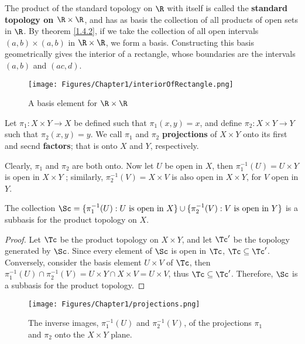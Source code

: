 \begin{example}
    The product of the standard topology on $\R$ with itself is called the \textbf{standard topology 
    on $\R \times \R$}, and has as basis the collection of all products of open sets in $\R$. 
    By theorem \ref{1.4.2}, if we take the collection of all open intervals $(a,b) \times (a,b)$ in 
    $\R \times \R$, we form a basis. Constructing this basis geometrically gives the interior of 
    a rectangle, whose boundaries are the intervals  $(a,b)$ and  $(ac,d)$.

    \begin{figure}
        \centering
        \texttt{[image: Figures/Chapter1/interiorOfRectangle.png]}
        \caption{A basis element for $\R \times \R$}
        \label{fig1.4}
    \end{figure}
\end{example} 

\begin{definition}
    Let $\pi_1:X \times Y \rightarrow X$ be defined such that  $\pi_1(x,y)=x$, and define $\pi_2:X \times Y \rightarrow Y$ 
    such that $\pi_2(x,y)=y$. We call $\pi_1$ and $\pi_2$ \textbf{projections} of $X \times Y$ onto 
    its  first and secnd \textbf{factors}; that is onto $X$ and $Y$, respectively.
\end{definition}

Clearly, $\pi_1$ and $\pi_2$ are both onto. Now let $U$ be open in  $X$, then 
$\pi_1^{-1}(U)=U \times Y$ is open in $X \times Y$ ; similarly, $\pi_2^{-1}(V)=X \times V$ is also open 
in $X \times Y$, for  $V$ open in  $Y$.

\begin{theorem}\label{1.4.3}
    The collection $\Sc=\{\pi_1^{-1}(U): U \text{ is open in } X\} \cup \{\pi_2^{-1}(V): V \text{ is open in } Y\}$ 
    is a subbasis for the product topology on $X$.
\end{theorem}
\begin{proof}
    Let $\Tc$ be the product topology on  $X \times Y$, and let  $\Tc'$ be the topology 
    generated by $\Sc$. Since every element of  $\Sc$ is open in  $\Tc$,  $\Tc \subseteq \Tc'$. Conversely, 
    consider the basis element  $U \times V$ of $\Tc$, then  $\pi_1^{-1}(U) \cap \pi_2^{-1}(V)=
    U \times Y \cap X \times V=U \times V$, thus $\Tc \subseteq \Tc'$. Therefore, $\Sc$ is a subbasis for the 
    product topology.
\end{proof}

\begin{figure}
    \centering
    \texttt{[image: Figures/Chapter1/projections.png]}
    \caption{The inverse images, $\pi_1^{-1}(U)$ and $\pi_2^{-1}(V)$, of the
    projections $\pi_1$ and $\pi_2$ onto the $X \times Y$ plane.}
    \label{fig1.5}
\end{figure}
